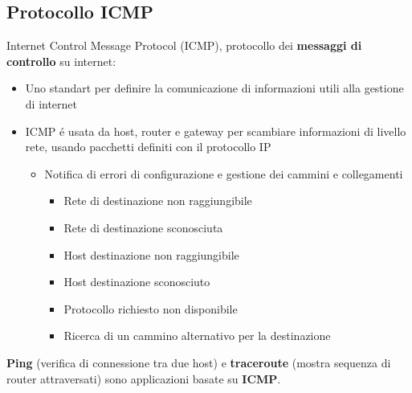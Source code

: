 \documentclass{article}
\begin{document}
\subsection{Protocollo ICMP}
Internet Control Message Protocol (ICMP), protocollo dei \textbf{messaggi di controllo} su internet:
\begin{itemize}
    \item Uno standart per definire la comunicazione di informazioni utili alla gestione di internet
    \item ICMP \'e usata da host, router e gateway per scambiare informazioni di livello rete, usando pacchetti definiti con il protocollo IP
    \begin{itemize}
        \item Notifica di errori di configurazione e gestione dei cammini e collegamenti
        \begin{itemize}
            \item Rete di destinazione non raggiungibile
            \item Rete di destinazione sconosciuta 
            \item Host destinazione non raggiungibile
            \item Host destinazione sconosciuto
            \item Protocollo richiesto non disponibile
            \item Ricerca di un cammino alternativo per la destinazione
        \end{itemize}
    \end{itemize}
\end{itemize}

\textbf{Ping} (verifica di connessione tra due host) e \textbf{traceroute} (mostra sequenza di router attraversati) sono applicazioni basate su \textbf{ICMP}. 
\end{document}
